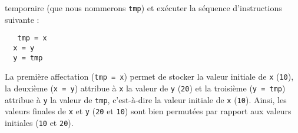 temporaire (que nous nommerons {\tt tmp}) et exécuter la séquence d'instructions suivante :\\
\begin{minipage}[t]{2cm}\footnotesize\tt
\mbox{}\ \ tmp = x\\
\mbox{}\ \ x = y\\
\mbox{}\ \ y = tmp
\end{minipage}
\hfill
\begin{minipage}[t]{13cm}\footnotesize
La première affectation ({\tt tmp = x}) permet de stocker la valeur initiale de {\tt x} ({\tt 10}),
la deuxième ({\tt x = y}) attribue à {\tt x} la valeur de {\tt y} ({\tt 20}) et la troisième ({\tt y = tmp})
attribue à {\tt y} la valeur de {\tt tmp}, c'est-à-dire la valeur initiale de {\tt x} ({\tt 10}).
Ainsi, les valeurs finales de {\tt x} et {\tt y} ({\tt 20} et {\tt 10}) sont bien permutées 
par rapport aux valeurs initiales ({\tt 10} et {\tt 20}).
\end{minipage}

\mbox{}

